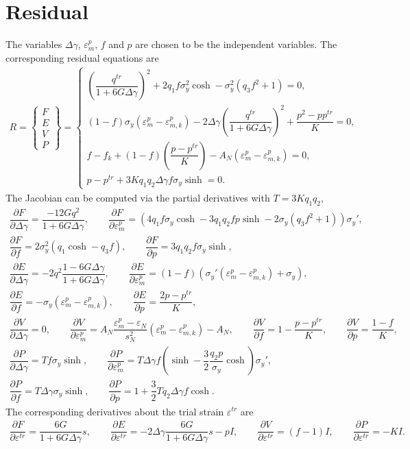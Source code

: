 \documentclass[10pt,fleqn,3p]{elsarticle}
\newcommand*{\pfrac}[2]{\dfrac{\partial#1}{\partial#2}}
\begin{document}
\section{Residual}
The variables $\Delta\gamma$, $\varepsilon^p_m$, $f$ and $p$ are chosen to be the independent variables. The corresponding residual equations are
\begin{gather}
R=\begin{Bmatrix}
F\\E\\V\\P
\end{Bmatrix}=\left\{\begin{array}{l}
\left(\dfrac{q^{tr}}{1+6G\Delta\gamma}\right)^2+2q_1f\sigma_y^2\cosh-\sigma_y^2\left(q_3f^2+1\right)=0,\\
\left(1-f\right)\sigma_y\left(\varepsilon^p_m-\varepsilon^p_{m,k}\right)-2\Delta\gamma\left(\dfrac{q^{tr}}{1+6G\Delta\gamma}\right)^2+\dfrac{p^2-pp^{tr}}{K}=0,\\
f-f_k+\left(1-f\right)\left(\dfrac{p-p^{tr}}{K}\right)-A_N\left(\varepsilon^p_m-\varepsilon^p_{m,k}\right)=0,\\[4mm]
p-p^{tr}+3Kq_1q_2\Delta\gamma{}f\sigma_y\sinh=0.
\end{array}\right.
\end{gather}
The Jacobian can be computed via the partial derivatives with $T=3Kq_1q_2$,
\begin{gather*}
\pfrac{F}{\Delta\gamma}=\dfrac{-12Gq^2}{1+6G\Delta\gamma},\qquad
\pfrac{F}{\varepsilon^p_m}=\left(4q_1f\sigma_y\cosh-3q_1q_2fp\sinh-2\sigma_y\left(q_3f^2+1\right)\right)\sigma_y',\\
\pfrac{F}{f}=2\sigma_y^2\left(q_1\cosh-q_3f\right),\qquad
\pfrac{F}{p}=3q_1q_2f\sigma_y\sinh,\\
\pfrac{E}{\Delta\gamma}=-2q^2\dfrac{1-6G\Delta\gamma}{1+6G\Delta\gamma},\qquad
\pfrac{E}{\varepsilon^p_m}=\left(1-f\right)\left(\sigma_y'\left(\varepsilon^p_m-\varepsilon^p_{m,k}\right)+\sigma_y\right),\\
\pfrac{E}{f}=-\sigma_y\left(\varepsilon^p_m-\varepsilon^p_{m,k}\right),\qquad
\pfrac{E}{p}=\dfrac{2p-p^{tr}}{K},\\
\pfrac{V}{\Delta\gamma}=0,\qquad
\pfrac{V}{\varepsilon^p_m}=A_N\dfrac{\varepsilon^p_m-\varepsilon_N}{s_N^2}\left(\varepsilon^p_m-\varepsilon^p_{m,k}\right)-A_N,\qquad
\pfrac{V}{f}=1-\dfrac{p-p^{tr}}{K},\qquad
\pfrac{V}{p}=\dfrac{1-f}{K},\\
\pfrac{P}{\Delta\gamma}=Tf\sigma_y\sinh,\qquad
\pfrac{P}{\varepsilon^p_m}=T\Delta\gamma{}f\left(\sinh-\dfrac{3}{2}\dfrac{q_2p}{\sigma_y}\cosh\right)\sigma_y',\\
\pfrac{P}{f}=T\Delta\gamma{}\sigma_y\sinh,\qquad
\pfrac{P}{p}=1+\dfrac{3}{2}Tq_2\Delta\gamma{}f\cosh.
\end{gather*}
The corresponding derivatives about the trial strain $\varepsilon^{tr}$ are
\begin{gather*}
\pfrac{F}{\varepsilon^{tr}}=\dfrac{6G}{1+6G\Delta\gamma}s,\qquad
\pfrac{E}{\varepsilon^{tr}}=-2\Delta\gamma\dfrac{6G}{1+6G\Delta\gamma}s-pI,\qquad
\pfrac{V}{\varepsilon^{tr}}=\left(f-1\right)I,\qquad
\pfrac{P}{\varepsilon^{tr}}=-KI.
\end{gather*}
\end{document}
